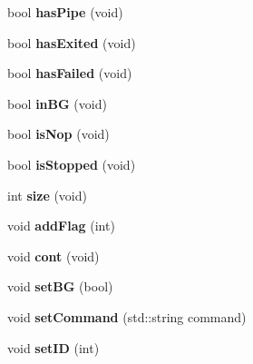 \begin{DoxyCompactItemize}
\item 
\hypertarget{classJob_ae55908885f94c96171e8bd786ae18dbc}{
bool {\bfseries hasPipe} (void)}
\label{classJob_ae55908885f94c96171e8bd786ae18dbc}

\item 
\hypertarget{classJob_a6e1542f32aa8136ae241b5c0bf04625c}{
bool {\bfseries hasExited} (void)}
\label{classJob_a6e1542f32aa8136ae241b5c0bf04625c}

\item 
\hypertarget{classJob_af62d84ef6e6d3239b255660ad5e72473}{
bool {\bfseries hasFailed} (void)}
\label{classJob_af62d84ef6e6d3239b255660ad5e72473}

\item 
\hypertarget{classJob_afbc97d6397910dc485d7447c969864e0}{
bool {\bfseries inBG} (void)}
\label{classJob_afbc97d6397910dc485d7447c969864e0}

\item 
\hypertarget{classJob_ac9d379bfaf490e9a6e2d345b8c4c2e22}{
bool {\bfseries isNop} (void)}
\label{classJob_ac9d379bfaf490e9a6e2d345b8c4c2e22}

\item 
\hypertarget{classJob_adadaf29b984ba0c37951d2aeb3fc91d2}{
bool {\bfseries isStopped} (void)}
\label{classJob_adadaf29b984ba0c37951d2aeb3fc91d2}

\item 
\hypertarget{classJob_ad66e7590180ed37952b2345be6029678}{
int {\bfseries size} (void)}
\label{classJob_ad66e7590180ed37952b2345be6029678}

\item 
\hypertarget{classJob_ad24dd6e92c8e018a03af78dc1732c8bb}{
void {\bfseries addFlag} (int)}
\label{classJob_ad24dd6e92c8e018a03af78dc1732c8bb}

\item 
\hypertarget{classJob_aa5e064b7c3ec4b7612005a8d028fe1f9}{
void {\bfseries cont} (void)}
\label{classJob_aa5e064b7c3ec4b7612005a8d028fe1f9}

\item 
\hypertarget{classJob_a9519727231781f79a5750b1439e61d7b}{
void {\bfseries setBG} (bool)}
\label{classJob_a9519727231781f79a5750b1439e61d7b}

\item 
\hypertarget{classJob_a9b4f744fbb9b204b980c15fe0bf5f64e}{
void {\bfseries setCommand} (std::string command)}
\label{classJob_a9b4f744fbb9b204b980c15fe0bf5f64e}

\item 
\hypertarget{classJob_ab0ca6966e266557e56cc570fdfa8c8b0}{
void {\bfseries setID} (int)}
\label{classJob_ab0ca6966e266557e56cc570fdfa8c8b0}


\end{DoxyCompactItemize}
